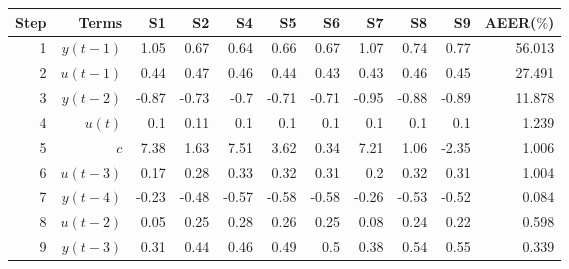 \begin{tabular}{rrrrrrrrrrr}
Step & Terms & S1 & S2 & S4 & S5 & S6 & S7 & S8 & S9 & AEER($\%$) \\ 
\hline 
1 & $y(t-1)$ & 1.05 & 0.67 & 0.64 & 0.66 & 0.67 & 1.07 & 0.74 & 0.77 & 56.013 \\ 
2 & $u(t-1)$ & 0.44 & 0.47 & 0.46 & 0.44 & 0.43 & 0.43 & 0.46 & 0.45 & 27.491 \\ 
3 & $y(t-2)$ & -0.87 & -0.73 & -0.7 & -0.71 & -0.71 & -0.95 & -0.88 & -0.89 & 11.878 \\ 
4 & $u(t)$ & 0.1 & 0.11 & 0.1 & 0.1 & 0.1 & 0.1 & 0.1 & 0.1 & 1.239 \\ 
5 & $c$ & 7.38 & 1.63 & 7.51 & 3.62 & 0.34 & 7.21 & 1.06 & -2.35 & 1.006 \\ 
6 & $u(t-3)$ & 0.17 & 0.28 & 0.33 & 0.32 & 0.31 & 0.2 & 0.32 & 0.31 & 1.004 \\ 
7 & $y(t-4)$ & -0.23 & -0.48 & -0.57 & -0.58 & -0.58 & -0.26 & -0.53 & -0.52 & 0.084 \\ 
8 & $u(t-2)$ & 0.05 & 0.25 & 0.28 & 0.26 & 0.25 & 0.08 & 0.24 & 0.22 & 0.598 \\ 
9 & $y(t-3)$ & 0.31 & 0.44 & 0.46 & 0.49 & 0.5 & 0.38 & 0.54 & 0.55 & 0.339 \\ 
\hline 
\end{tabular}